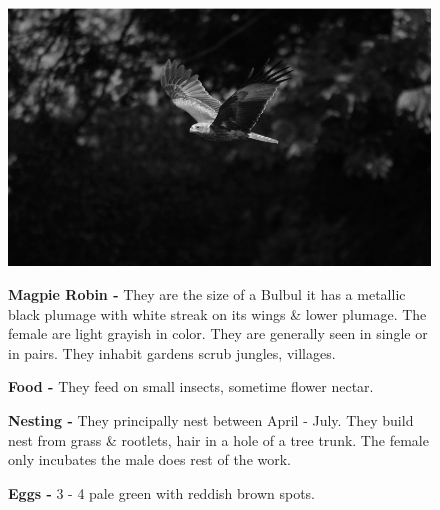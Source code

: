 \begin{figure}[H]
\begin{center}
\includegraphics{figure/Land_birds/01_pariah_kite/pariah-kite.eps}
\end{center}
\medskip
\noindent
{\bf Magpie Robin -} They are the size of a Bulbul it has a metallic black plumage with white streak on its wings \& lower plumage. The female are light grayish in color. They are generally seen in single or in pairs. They inhabit gardens scrub jungles, villages.

\medskip
{\bf Food -} They feed on small insects, sometime flower nectar.

{\bf Nesting -} They principally nest between April - July. They build nest from grass \& rootlets, hair in a hole of a tree trunk. The female only incubates the male does rest of the work.

{\bf Eggs -} 3 - 4 pale green with reddish brown spots.
\end{figure}

\vfill\eject

~\phantom{a}
\vfill


